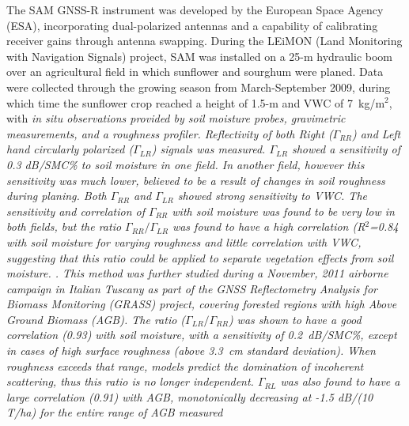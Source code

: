 \documentclass[draftcls,onecolumn]{IEEEtran}  %
\begin{document}

The SAM GNSS-R instrument was developed by the European Space Agency (ESA), incorporating dual-polarized antennas and a capability of calibrating receiver gains through antenna swapping.
During the LEiMON  (Land Monitoring with Navigation Signals) project,  SAM was installed on a 25-m hydraulic boom over an agricultural field in which sunflower and sourghum were planed. 
Data were collected through the growing season from March-September 2009, during which time the sunflower crop reached a height of 1.5-m and VWC of 7~kg/m${}^2$, with 
\it in situ \rm observations provided by soil moisture probes,  gravimetric measurements, and a roughness profiler.
Reflectivity of both Right ($\Gamma_{RR}$) and Left hand circularly polarized ($\Gamma_{LR}$) signals was measured.
 $\Gamma_{LR}$ showed a sensitivity  of 0.3 dB/SMC\% to soil moisture in one field. 
In another field, however this sensitivity was much lower, believed to be a result of changes in soil roughness during planing. 
Both $\Gamma_{RR}$ and $\Gamma_{LR}$ showed strong sensitivity to VWC.
The sensitivity and correlation of $\Gamma_{RR}$ with soil moisture was found to be very low in both fields, but the ratio $\Gamma_{RR}/\Gamma_{LR}$ was found to have a high correlation (R${}^2$=0.84 with soil moisture for varying roughness and little correlation with VWC,
suggesting that this ratio could be applied to separate vegetation effects from soil moisture. 
\cite{Egido2012a}.
This method was further studied during a November, 2011 airborne campaign in Italian Tuscany as part of the GNSS Reflectometry Analysis for Biomass Monitoring (GRASS) project, covering forested regions with high Above Ground Biomass (AGB).
The ratio ($\Gamma_{LR}/\Gamma_{RR}$) was shown to have a good correlation (0.93) with soil moisture, with a sensitivity of 0.2~dB/SMC\%, except in cases of high surface roughness (above 3.3~cm standard deviation).  
When roughness exceeds that range, models predict the domination of incoherent scattering, thus this ratio is no longer independent. 
$\Gamma_{RL}$ was also found to have a large correlation (0.91) with AGB, monotonically decreasing at -1.5 dB/(10~ T/ha) for the entire range of AGB measured 
\end{document}
